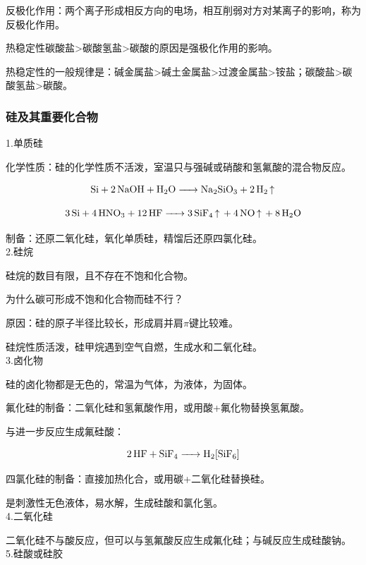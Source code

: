 \documentclass[a4paper,UTF8]{article}
\begin{document}
反极化作用：两个离子形成相反方向的电场，相互削弱对方对某离子的影响，称为反极化作用。

热稳定性碳酸盐>碳酸氢盐>碳酸的原因是强极化作用的影响。

热稳定性的一般规律是：碱金属盐>碱土金属盐>过渡金属盐>铵盐；碳酸盐>碳酸氢盐>碳酸。

\subsubsection{硅及其重要化合物}

1.单质硅

化学性质：硅的化学性质不活泼，室温只与强碱或硝酸和氢氟酸的混合物反应。

$$ \ce{Si + 2NaOH + H2O -> Na2SiO3 + 2H2 ^} $$

$$ \ce{3Si + 4HNO3 + 12HF -> 3SiF4 ^ + 4NO ^ + 8H2O} $$

制备：还原二氧化硅，氧化单质硅，精馏后还原四氯化硅。\\

2.硅烷

硅烷的数目有限，且不存在不饱和化合物。

\begin{tcolorbox}

	为什么碳可形成不饱和化合物而硅不行？

	原因：硅的原子半径比较长，形成肩并肩$\pi$键比较难。

\end{tcolorbox}

硅烷性质活泼，硅甲烷遇到空气自燃，生成水和二氧化硅。\\

3.卤化物

硅的卤化物都是无色的，常温为气体，为液体，为固体。

氟化硅的制备：二氧化硅和氢氟酸作用，或用酸+氟化物替换氢氟酸。

与进一步反应生成氟硅酸：

$$ \ce{2HF + SiF4 -> H2[SiF6]} $$

四氯化硅的制备：直接加热化合，或用碳+二氧化硅替换硅。

是刺激性无色液体，易水解，生成硅酸和氯化氢。\\

4.二氧化硅

二氧化硅不与酸反应，但可以与氢氟酸反应生成氟化硅；与碱反应生成硅酸钠。\\

5.硅酸或硅胶
\end{document}
